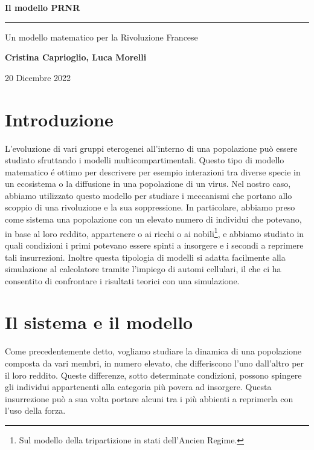 \begin{center}
	\huge \textbf{Il modello PRNR}
	
	\rule{7cm}{0.4pt} 
	
	\LARGE Un modello matematico per la Rivoluzione Francese
	
	\vspace{20pt}
	
	\LARGE \textbf{Cristina Caprioglio, Luca Morelli}
	
	\vspace{5pt}
	
	\LARGE 20 Dicembre 2022
	
	\vspace{20pt}
 
	\normalsize
\end{center}  
\section*{Introduzione}
L'evoluzione di vari gruppi eterogenei all'interno di una popolazione può essere studiato sfruttando i modelli multicompartimentali. Questo tipo di modello matematico é ottimo per descrivere per esempio interazioni tra diverse specie in un ecosistema o la diffusione in una popolazione di un virus. Nel nostro caso, abbiamo utilizzato questo modello per studiare i meccanismi che portano allo scoppio di una rivoluzione e la sua soppressione. In particolare, abbiamo preso come sistema una popolazione con un elevato numero di individui che potevano, in base al loro reddito, appartenere o ai ricchi o ai nobili\footnote{Sul modello della tripartizione in stati dell'Ancien Regime.}, e abbiamo studiato in quali condizioni i primi potevano essere spinti a insorgere e i secondi a reprimere tali insurrezioni. Inoltre questa tipologia di modelli si adatta facilmente alla simulazione al calcolatore tramite l'impiego di automi cellulari, il che ci ha consentito di confrontare i risultati teorici con una simulazione.
\section{Il sistema e il modello} \label{sistema modello}
Come precedentemente detto, vogliamo studiare la dinamica di una popolazione composta da vari membri, in numero elevato, che differiscono l'uno dall'altro per il loro reddito. Queste differenze, sotto determinate condizioni, possono spingere gli individui appartenenti alla categoria più povera ad insorgere. Questa insurrezione può a sua volta portare alcuni tra i più abbienti a reprimerla con l'uso della forza.\\

